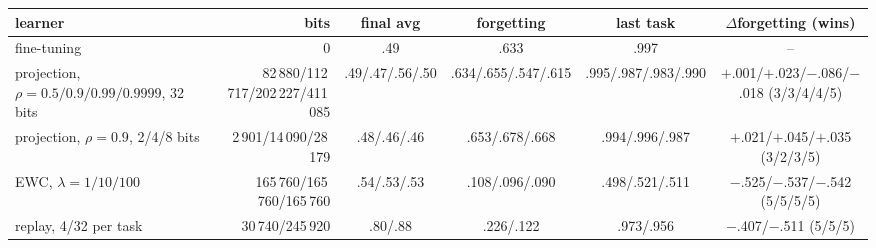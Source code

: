 \begin{tabular}{>{\raggedright\arraybackslash}p{3.6cm}rcccc}
\toprule
learner & bits & final avg & forgetting & last task & $\Delta$forgetting (wins) \\
\midrule
fine-tuning & 0 & .49 & .633 & .997 & -- \\
projection, $\rho=0.5/0.9/0.99/0.9999$, 32 bits & 82\,880/112\,717/202\,227/411\,085 & .49/.47/.56/.50 & .634/.655/.547/.615 & .995/.987/.983/.990 & $+$.001/$+$.023/$-$.086/$-$.018 (3/3/4/4/5) \\
projection, $\rho=0.9$, 2/4/8 bits & 2\,901/14\,090/28\,179 & .48/.46/.46 & .653/.678/.668 & .994/.996/.987 & $+$.021/$+$.045/$+$.035 (3/2/3/5) \\
EWC, $\lambda=1/10/100$ & 165\,760/165\,760/165\,760 & .54/.53/.53 & .108/.096/.090 & .498/.521/.511 & $-$.525/$-$.537/$-$.542 (5/5/5/5) \\
replay, 4/32 per task & 30\,740/245\,920 & .80/.88 & .226/.122 & .973/.956 & $-$.407/$-$.511 (5/5/5) \\
\bottomrule
\end{tabular}
